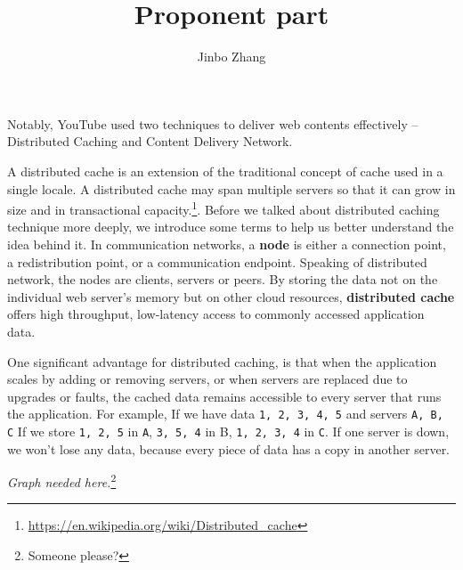 \documentclass{article}
\author{Jinbo Zhang}
\title{Proponent part}
\begin{document}
Notably, YouTube used two techniques to deliver web contents effectively -- Distributed Caching and Content Delivery Network.

A distributed cache is an extension of the traditional concept of cache used in a single locale. A distributed cache may span multiple servers so that it can grow in size and in transactional capacity.\footnote{\url{https://en.wikipedia.org/wiki/Distributed_cache}}. Before we talked about distributed caching technique more deeply, we introduce some terms to help us better understand the idea behind it. In communication networks, a \textbf{node} is either a connection point, a redistribution point, or a communication endpoint. Speaking of distributed network, the nodes are clients, servers or peers. By storing the data not on the individual web server's memory but on other cloud resources, \textbf{distributed cache} offers high throughput, low-latency access to commonly accessed application data.

One significant advantage for distributed caching, is that when the application scales by adding or removing servers, or when servers are replaced due to upgrades or faults, the cached data remains accessible to every server that runs the application. For example, If we have data \texttt{1, 2, 3, 4, 5} and servers \texttt{A, B, C} If we store \texttt{1, 2, 5} in \texttt{A}, \texttt{3, 5, 4} in B, \texttt{1, 2, 3, 4} in \texttt{C}. If one server is down, we won't lose any data, because every piece of data has a copy in another server. 

\textit{Graph needed here.}\footnote{Someone please?}
\end{document}
